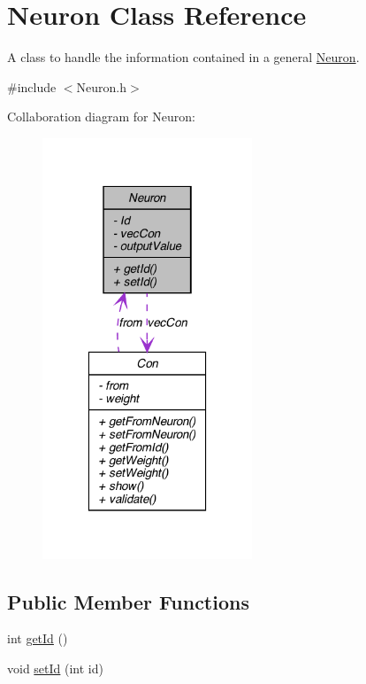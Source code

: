 \hypertarget{class_neuron}{
\section{Neuron Class Reference}
\label{class_neuron}
}


A class to handle the information contained in a general \hyperlink{class_neuron}{Neuron}.  




{\ttfamily \#include $<$Neuron.h$>$}



Collaboration diagram for Neuron:\nopagebreak
\begin{figure}[H]
\begin{center}
\leavevmode
\includegraphics[width=178pt]{class_neuron__coll__graph}
\end{center}
\end{figure}
\subsection*{Public Member Functions}
\begin{DoxyCompactItemize}
\item 
int \hyperlink{class_neuron_ad9211d55ea50ad6dfbd2676b9e2335e4}{getId} ()
\item 
void \hyperlink{class_neuron_aefc6637d3b0a20669af3b7e92a7bf209}{setId} (int id)
\end{DoxyCompactItemize}
